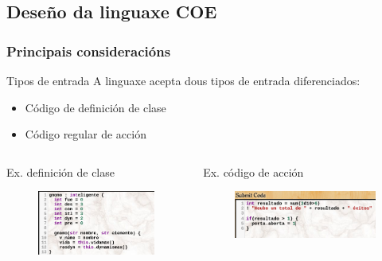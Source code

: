 \documentclass[12pt]{beamer}
\begin{document}
\subsection{Deseño da linguaxe COE}
\begin{frame}
\frametitle{Principais consideracións}
\begin{block}{Tipos de entrada}
A linguaxe acepta dous tipos de entrada diferenciados:
\begin{itemize}
  \item Código de definición de clase
  \item Código regular de acción
\end{itemize}
\end{block}
\begin{columns}[T]
\begin{column}[T]{5cm}
\begin{exampleblock}{Ex. definición de clase}
\begin{figure}
\includegraphics[scale=0.4]{figuras/presentacion/demiugo_gnomo.png} 
\end{figure}
\end{exampleblock}
\end{column}
\begin{column}[T]{5cm}
\begin{exampleblock}{Ex. código de acción}
\begin{figure}
\includegraphics[scale=0.4]{figuras/presentacion/demiurgo_accion.png} 
\end{figure}
\end{exampleblock}
\end{column}
\end{columns}
\end{frame}
\end{document}
